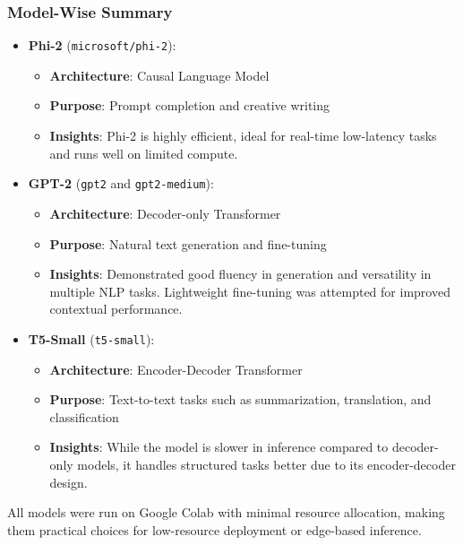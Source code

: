 \documentclass[letterpaper,11pt]{report}
\begin{document}
\subsubsection*{Model-Wise Summary}

\begin{itemize}
    \item \textbf{Phi-2} (\texttt{microsoft/phi-2}):
    \begin{itemize}
        \item \textbf{Architecture}: Causal Language Model
        \item \textbf{Purpose}: Prompt completion and creative writing
        \item \textbf{Insights}: Phi-2 is highly efficient, ideal for real-time low-latency tasks and runs well on limited compute.
    \end{itemize}

    \item \textbf{GPT-2} (\texttt{gpt2} and \texttt{gpt2-medium}):
    \begin{itemize}
        \item \textbf{Architecture}: Decoder-only Transformer
        \item \textbf{Purpose}: Natural text generation and fine-tuning
        \item \textbf{Insights}: Demonstrated good fluency in generation and versatility in multiple NLP tasks. Lightweight fine-tuning was attempted for improved contextual performance.
    \end{itemize}

    \item \textbf{T5-Small} (\texttt{t5-small}):
    \begin{itemize}
        \item \textbf{Architecture}: Encoder-Decoder Transformer
        \item \textbf{Purpose}: Text-to-text tasks such as summarization, translation, and classification
        \item \textbf{Insights}: While the model is slower in inference compared to decoder-only models, it handles structured tasks better due to its encoder-decoder design.
    \end{itemize}
\end{itemize}

All models were run on Google Colab with minimal resource allocation, making them practical choices for low-resource deployment or edge-based inference.

\medskip
\end{document}
